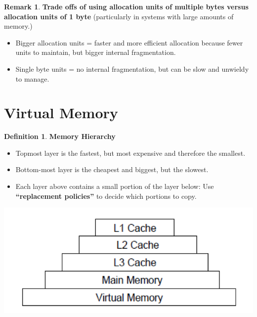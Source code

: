 \documentclass[11pt,a4paper]{article}
\theoremstyle{definition}
\newtheorem*{remark}{Remark}
\newtheorem{definition}{Definition}[section]
\newenvironment{myitemize}
{ \begin{itemize}
    \setlength{\itemsep}{5pt}
    \setlength{\parskip}{0pt}
    \setlength{\parsep}{0pt}     }
{ \end{itemize}                  }
\begin{document}
\begin{remark}{\textbf{Trade offs of using allocation units of multiple bytes versus allocation units of 1 byte}} (particularly in systems with large amounts of memory.)

	\begin{myitemize}
		\item Bigger allocation units = faster and more efficient allocation because fewer units to maintain, but bigger internal fragmentation.
		\item Single byte units = no internal fragmentation, but can be slow and unwieldy to manage.
	\end{myitemize}
	
\end{remark}


\newpage
\section{Virtual Memory}

\begin{definition}{\textbf{Memory Hierarchy}}
	
	\begin{minipage}{0.5\linewidth}
	\begin{myitemize}
		\item Topmost layer is the fastest, but most expensive and therefore the smallest.
		\item Bottom-most layer is the cheapest and biggest, but the slowest.
		\item Each layer above contains a small portion of the layer below: Use \textbf{``replacement policies''} to decide which portions to copy.

	\end{myitemize}
\end{minipage}
\begin{minipage}{0.5\linewidth}
	\includegraphics[width=\linewidth]{m5/memoryHierarchy}
\end{minipage}
\end{definition}
\end{document}

